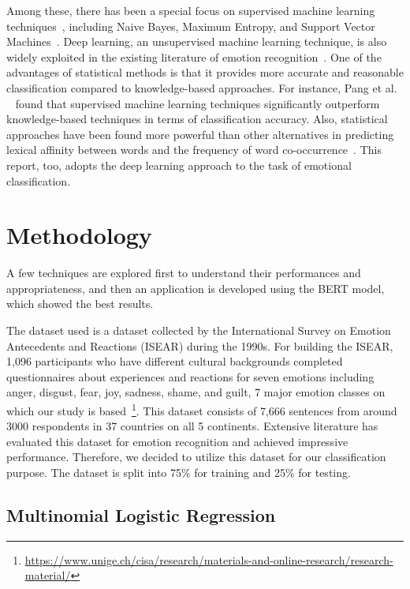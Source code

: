 \documentclass[11pt]{article}
\begin{document}
Among these,  there has been a special focus on supervised machine learning techniques~\cite{affect_rw1}, including Naive Bayes, Maximum Entropy, and Support Vector Machines~\cite{affect_rw11}. Deep learning, an unsupervised machine learning technique, is also widely exploited in the existing literature of emotion recognition~\cite{affect_rw1}. One of the advantages of statistical methods is that it provides more accurate and reasonable classification compared to knowledge-based approaches. For instance, Pang et al. ~\cite{affect_rw11} found that supervised machine learning techniques significantly outperform knowledge-based techniques in terms of classification accuracy. Also, statistical approaches have been found more powerful than other alternatives in predicting lexical affinity between words and the frequency of word co-occurrence~\cite{affect_rw2}. This report, too, adopts the deep learning approach to the task of emotional  classification.


\section{Methodology}
\label{sec:method}

A few techniques are explored first to understand their performances and appropriateness, and then an application is developed using the BERT model, which showed the best results.

The dataset used is a dataset collected by the International Survey on Emotion Antecedents and Reactions (ISEAR) during the 1990s. For building the ISEAR, 1,096 participants who have different cultural backgrounds completed questionnaires about experiences and reactions for seven emotions including anger, disgust, fear, joy, sadness, shame, and guilt, 7 major emotion classes on which our study is based~\footnote{\url{https://www.unige.ch/cisa/research/materials-and-online-research/research-material/}}. This dataset consists of 7,666 sentences from around 3000 respondents in 37 countries on all 5 continents. Extensive literature has evaluated this dataset for emotion recognition and achieved impressive performance. Therefore, we decided to utilize this dataset for our classification purpose. The dataset is split into 75\% for training and 25\% for testing. 

\subsection{Multinomial Logistic Regression}
\end{document}

